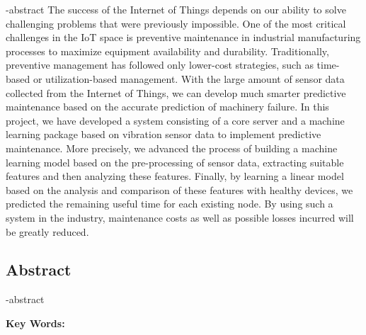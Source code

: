 
\en-abstract{
The success of the Internet of Things depends on our ability to solve challenging problems that were previously impossible. One of the most critical challenges in the IoT space is preventive maintenance in industrial manufacturing processes to maximize equipment availability and durability. Traditionally, preventive management has followed only lower-cost strategies, such as time-based or utilization-based management. With the large amount of sensor data collected from the Internet of Things, we can develop much smarter predictive maintenance based on the accurate prediction of machinery failure. In this project, we have developed a system consisting of a core server and a machine learning package based on vibration sensor data to implement predictive maintenance. More precisely, we advanced the process of building a machine learning model based on the pre-processing of sensor data, extracting suitable features and then analyzing these features. Finally, by learning a linear model based on the analysis and comparison of these features with healthy devices, we predicted the remaining useful time for each existing node. By using such a system in the industry, maintenance costs as well as possible losses incurred will be greatly reduced.
}

\newpage
\thispagestyle{empty}
\begin{latin}
\section*{\LARGE\centering Abstract}

\een-abstract

\vspace*{.5cm}
{\large\textbf{Key Words:}}\par
\vspace*{.5cm}
\elatinkeywords
\end{latin}